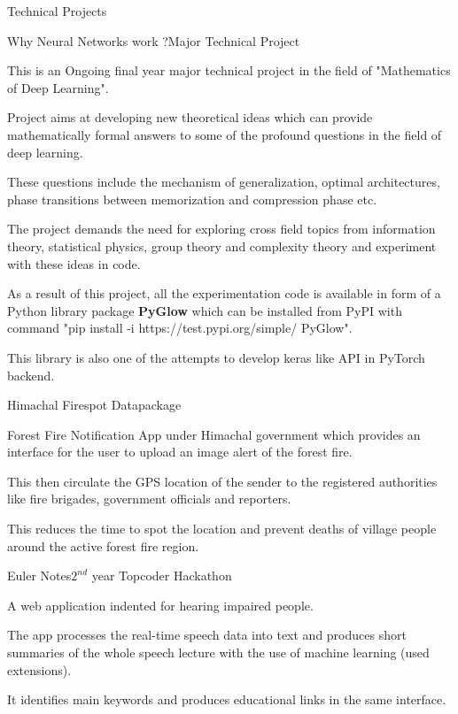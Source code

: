 \documentclass{resume} %
\begin{document}
\begin{rSection}{Technical Projects}

\begin{rSubsection}{Why Neural Networks work ?}{Major Technical Project}{}{}
\item This is an Ongoing final year major technical project in the field of "Mathematics of Deep Learning".
\item Project aims at developing new theoretical ideas which can provide mathematically formal answers to some of the profound questions in the field of deep learning.
\item These questions include the mechanism of generalization, optimal architectures, phase transitions between memorization and compression phase etc.
\item The project demands the need for exploring cross field topics from information theory, statistical physics, group theory and complexity theory and experiment with these ideas in code.
\item As a result of this project, all the experimentation code is available in form of a Python library package \textbf{PyGlow} which can be installed from PyPI with command "pip install -i https://test.pypi.org/simple/ PyGlow".
\item This library is also one of the attempts to develop keras like API in PyTorch backend.
\end{rSubsection}
\newpage
\begin{rSubsection}{Himachal Firespot Datapackage}{}{}{}
\item Forest Fire Notification App under Himachal government which provides an interface for the user to
upload an image alert of the forest fire. 
\item This then circulate the GPS location of the sender  to the registered authorities like fire brigades, government officials and reporters. 
\item This reduces the time to spot the location and prevent deaths of village people around the active forest fire region. 
\end{rSubsection}

\begin{rSubsection}{Euler Notes}{$2^{nd}$ year Topcoder Hackathon}{}{}
\item A web application indented for hearing impaired people. 
\item The app processes the real-time speech data into text and produces short summaries of the whole speech lecture with the use of machine learning (used extensions). 
\item It identifies main keywords and produces educational links in the same interface.
\end{rSubsection}

\end{rSection}
\end{document}
